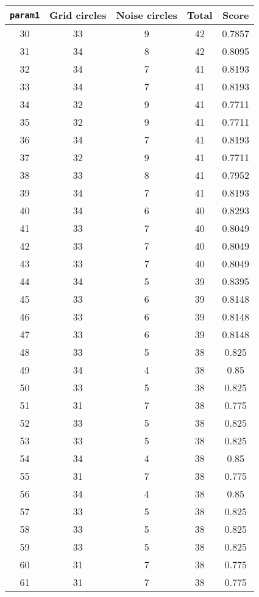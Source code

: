 \documentclass[letterpaper, 12pt]{article}
\begin{document}
\begin{longtable}{|c|c|c|c|c|}
\hline
\textbf{\texttt{param1}} & \textbf{Grid circles} & \textbf{Noise circles} & \textbf{Total} & \textbf{Score} \\
\hline
30 & 33 & 9 & 42 & 0.7857 \\
\hline
31 & 34 & 8 & 42 & 0.8095 \\
\hline
32 & 34 & 7 & 41 & 0.8193 \\
\hline
33 & 34 & 7 & 41 & 0.8193 \\
\hline
34 & 32 & 9 & 41 & 0.7711 \\
\hline
35 & 32 & 9 & 41 & 0.7711 \\
\hline
36 & 34 & 7 & 41 & 0.8193 \\
\hline
37 & 32 & 9 & 41 & 0.7711 \\
\hline
38 & 33 & 8 & 41 & 0.7952 \\
\hline
39 & 34 & 7 & 41 & 0.8193 \\
\hline
40 & 34 & 6 & 40 & 0.8293 \\
\hline
41 & 33 & 7 & 40 & 0.8049 \\
\hline
42 & 33 & 7 & 40 & 0.8049 \\
\hline
43 & 33 & 7 & 40 & 0.8049 \\
\hline
44 & 34 & 5 & 39 & 0.8395 \\
\hline
45 & 33 & 6 & 39 & 0.8148 \\
\hline
46 & 33 & 6 & 39 & 0.8148 \\
\hline
47 & 33 & 6 & 39 & 0.8148 \\
\hline
48 & 33 & 5 & 38 & 0.825 \\
\hline
49 & 34 & 4 & 38 & 0.85 \\
\hline
50 & 33 & 5 & 38 & 0.825 \\
\hline
51 & 31 & 7 & 38 & 0.775 \\
\hline
52 & 33 & 5 & 38 & 0.825 \\
\hline
53 & 33 & 5 & 38 & 0.825 \\
\hline
54 & 34 & 4 & 38 & 0.85 \\
\hline
55 & 31 & 7 & 38 & 0.775 \\
\hline
56 & 34 & 4 & 38 & 0.85 \\
\hline
57 & 33 & 5 & 38 & 0.825 \\
\hline
58 & 33 & 5 & 38 & 0.825 \\
\hline
59 & 33 & 5 & 38 & 0.825 \\
\hline
60 & 31 & 7 & 38 & 0.775 \\
\hline
61 & 31 & 7 & 38 & 0.775 \\

\end{longtable}
\end{document}
